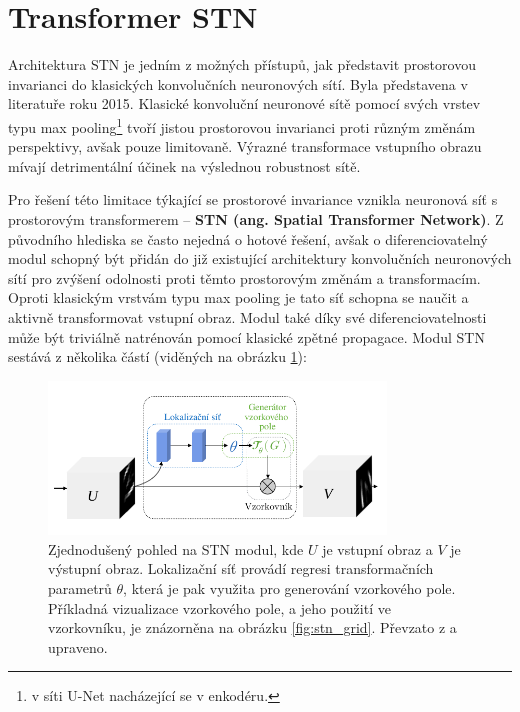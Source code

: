 \section{Transformer STN}
\label{sec:Chapter28}

Architektura STN je jedním z možných přístupů, jak představit prostorovou invarianci do klasických konvolučních neuronových sítí. Byla představena v literatuře \cite{stn} roku 2015. Klasické konvoluční neuronové sítě pomocí svých vrstev typu max pooling\footnote{v síti U-Net nacházející se v enkodéru.} tvoří jistou prostorovou invarianci proti různým změnám perspektivy, avšak pouze limitovaně. Výrazné transformace vstupního obrazu mívají detrimentální účinek na výslednou robustnost sítě.

Pro řešení této limitace týkající se prostorové invariance vznikla neuronová síť s prostorovým transformerem -- \textbf{STN (ang. Spatial Transformer Network)}. Z původního hlediska se často nejedná o hotové řešení, avšak o diferenciovatelný modul schopný být přidán do již existující architektury konvolučních neuronových sítí pro zvýšení odolnosti proti těmto prostorovým změnám a transformacím. Oproti klasickým vrstvám typu max pooling je tato síť schopna se naučit a aktivně transformovat vstupní obraz. Modul také díky své diferenciovatelnosti může být triviálně natrénován pomocí klasické zpětné propagace. Modul STN sestává z několika částí (viděných na obrázku \ref{fig:stn_overview}):

\begin{figure}[ht]
\centering
\includegraphics[width=0.8\textwidth,keepaspectratio]{Figures/stn/stn_module.pdf}
\caption[Zjednodušený pohled na STN modul]
{Zjednodušený pohled na STN modul, kde $U$ je vstupní obraz a $V$ je výstupní obraz. Lokalizační síť provádí regresi transformačních parametrů $\theta$, která je pak využita pro generování vzorkového pole. Příkladná vizualizace vzorkového pole, a jeho použití ve vzorkovníku, je znázorněna na obrázku \ref{fig:stn_grid}. Převzato z \cite{stn} a upraveno. }
\label{fig:stn_overview}
\end{figure}

